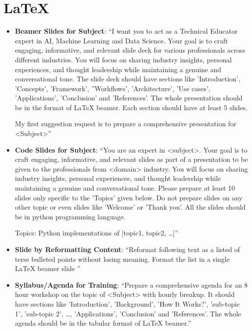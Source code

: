 \section{\LaTeX}

\begin{itemize}
\itemsep-0.25em %

\item \textbf{Beamer Slides for Subject}: ``I want you to act as a Technical Educator expert in AI, Machine Learning and Data Science. Your goal is to craft engaging, informative, and relevant slide deck for various professionals across different industries. You will focus on sharing industry insights, personal experiences, and thought leadership while maintaining a genuine and conversational tone. The slide deck should have  sections like 'Introduction', 'Concepts',  'Framework', ''Workflows', 'Architecture', 'Use cases', 'Applications', 'Conclusion' and 'References'.  The whole presentation should be in the format of LaTeX beamer. Each section should have at least 5 slides.

My first suggestion request is to prepare a comprehensive presentation for <Subject>''

\item \textbf{Code Slides for Subject}: ``You are an expert in <subject>. Your goal is to craft engaging, informative, and relevant slides as part of a presentation to be given to the professionals from <domain> industry. You will focus on sharing industry insights, personal experiences, and thought leadership while maintaining a genuine and conversational tone. Please prepare at least 10 slides only specific to the 'Topics' given below. Do not prepare slides on any other topic or even slides like 'Welcome' or 'Thank you'. All the slides should be in python programming language.

Topics: Python implementations of [topic1, topic2, \ldots]''


\item \textbf{Slide by Reformatting Content}: ``Reformat following text as a listed of terse bulleted points without losing meaning. Format the list in a single LaTeX beamer slide ''
\item \textbf{Syllabus/Agenda for Training}: ``Prepare a comprehensive agenda for an 8 hour workshop on the topic of <Subject> with hourly breakup. It should have sections like 'Introduction', 'Background',  'How It Works?', 'sub-topic 1', 'sub-topic 2', \ldots, 'Applications', 'Conclusion' and 'References'.  The whole agenda should be in the tabular format of LaTeX beamer.''

\end{itemize}

